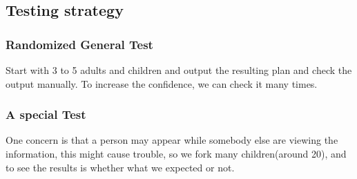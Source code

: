 \documentclass{article}
\begin{document}
	\subsection{Testing strategy}
	
	\subsubsection*{Randomized General Test}
	Start with 3 to 5 adults and children and output the resulting plan and check the output manually. To increase the confidence, we can check it many times.
	
	\subsubsection*{A special Test}
	One concern is that a person may appear while somebody else are viewing the information, this might cause trouble, so we fork many children(around 20), and to see the results is whether what we expected or not.
\end{document}
